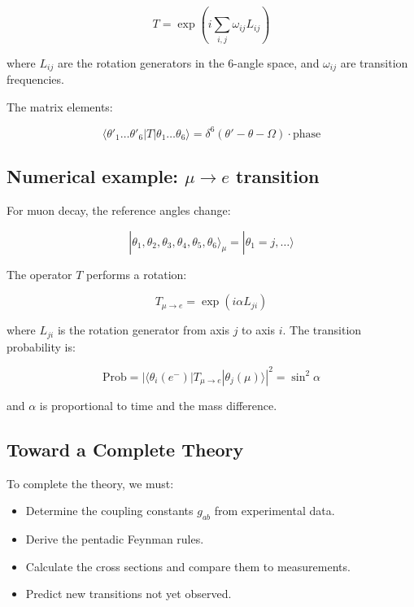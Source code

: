 \documentclass[11pt]{article}
\providecommand{\tightlist}{%
\setlength{\itemsep}{2pt}\setlength{\parskip}{6pt}
}
\begin{document}
\[
T = \exp\!\left( i\sum_{i,j} \omega_{ij} L_{ij} \right)
\]

where \(L_{ij}\) are the rotation generators in the 6-angle space, and
\(\omega_{ij}\) are transition frequencies.

The matrix elements:

\[
\langle \theta'_1\dots\theta'_6 | T | \theta_1\dots\theta_6 \rangle = \delta^6(\theta' - \theta - \Omega) \cdot \text{phase}
\]

\hypertarget{numerical-example-mu-to-e-transition}{%
\subsection{\texorpdfstring{Numerical example: \(\mu \to e\)
transition}{Numerical example: \textbackslash mu \textbackslash to e transition}}\label{numerical-example-mu-to-e-transition}}

For muon decay, the reference angles change:

\[
|\theta_1,\theta_2,\theta_3,\theta_4,\theta_5,\theta_6\rangle_\mu = |\theta_1=j,\dots\rangle
\]

The operator \(T\) performs a rotation:

\[
T_{\mu\to e} = \exp(i\alpha L_{ji})
\]

where \(L_{ji}\) is the rotation generator from axis \(j\) to axis
\(i\). The transition probability is:

\[
\text{Prob} = |\langle \theta_i(e^-)| T_{\mu\to e} |\theta_j(\mu)\rangle|^2 = \sin^2\alpha
\]

and \(\alpha\) is proportional to time and the mass difference.

\hypertarget{toward-a-complete-theory}{%
\subsection{Toward a Complete Theory}\label{toward-a-complete-theory}}

To complete the theory, we must:

\begin{itemize}
\tightlist
\item
  Determine the coupling constants \(g_{ab}\) from experimental data.
\item
  Derive the pentadic Feynman rules.
\item
  Calculate the cross sections and compare them to measurements.
\item
  Predict new transitions not yet observed.
\end{itemize}
\end{document}
